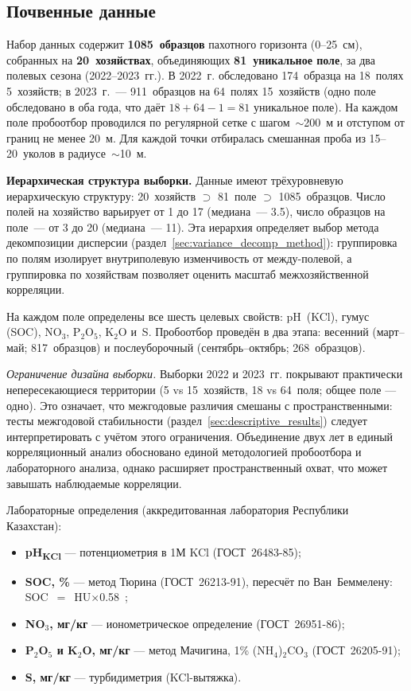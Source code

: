 \subsection{Почвенные данные}
\label{sec:soil_data}

Набор данных содержит \textbf{1085~образцов} пахотного горизонта (0--25~см), собранных на \textbf{20~хозяйствах}, объединяющих \textbf{81~уникальное поле}, за два полевых сезона (2022--2023~гг.).
В 2022~г. обследовано 174~образца на 18~полях 5~хозяйств; в 2023~г.~--- 911~образцов на 64~полях 15~хозяйств (одно поле обследовано в оба года, что даёт $18 + 64 - 1 = 81$ уникальное поле).
На каждом поле пробоотбор проводился по регулярной сетке с шагом~$\sim$200~м и отступом от границ не менее 20~м.
Для каждой точки отбиралась смешанная проба из 15--20~уколов в радиусе~$\sim$10~м.

\textbf{Иерархическая структура выборки.}
Данные имеют трёхуровневую иерархическую структуру: 20~хозяйств $\supset$ 81~поле $\supset$ 1085~образцов.
Число полей на хозяйство варьирует от 1 до 17 (медиана~--- 3.5), число образцов на поле~--- от 3 до 20 (медиана~--- 11).
Эта иерархия определяет выбор метода декомпозиции дисперсии (раздел~\ref{sec:variance_decomp_method}): группировка по полям изолирует внутриполевую изменчивость от между-полевой, а группировка по хозяйствам позволяет оценить масштаб межхозяйственной корреляции.

На каждом поле определены все шесть целевых свойств: pH~(KCl), гумус (SOC), NO$_3$, P$_2$O$_5$, K$_2$O и~S.
Пробоотбор проведён в два этапа: весенний (март--май; 817~образцов) и послеуборочный (сентябрь--октябрь; 268~образцов).

\textit{Ограничение дизайна выборки.} Выборки 2022 и 2023~гг. покрывают практически непересекающиеся территории (5 vs 15~хозяйств, 18 vs 64~поля; общее поле --- одно). Это означает, что межгодовые различия смешаны с пространственными: тесты межгодовой стабильности (раздел~\ref{sec:descriptive_results}) следует интерпретировать с учётом этого ограничения. Объединение двух лет в единый корреляционный анализ обосновано единой методологией пробоотбора и лабораторного анализа, однако расширяет пространственный охват, что может завышать наблюдаемые корреляции.

Лабораторные определения (аккредитованная лаборатория Республики Казахстан):
\begin{itemize}[nosep]
  \item \textbf{pH\textsubscript{KCl}} --- потенциометрия в 1М KCl (ГОСТ~26483-85);
  \item \textbf{SOC, \%} --- метод Тюрина (ГОСТ~26213-91), пересчёт по Ван~Беммелену: SOC~$=$~HU$\times$0.58~\citep{Pribyl2010};
  \item \textbf{NO$_3$, мг/кг} --- ионометрическое определение (ГОСТ~26951-86);
  \item \textbf{P$_2$O$_5$ и K$_2$O, мг/кг} --- метод Мачигина, 1\% (NH$_4$)$_2$CO$_3$ (ГОСТ~26205-91);
  \item \textbf{S, мг/кг} --- турбидиметрия (KCl-вытяжка).
\end{itemize}

